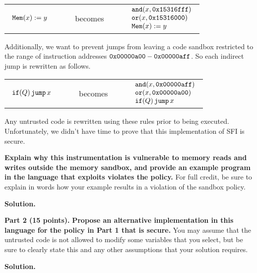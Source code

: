 \documentclass[10pt]{article}
\newcommand{\pand}[2]{\keywordfont{and}(#1, #2)}
\newcommand{\por}[2]{\keywordfont{or}(#1, #2)}
\begin{document}
\begin{enumerate}
\begin{center}
\begin{tabular}{lcl}
$
\begin{array}{l}
\texttt{\upshape Mem}(x) := y
\end{array}
$
&
\ \ \ \ becomes\ \ \ \ 
&
$
\begin{array}{l}
\pand{x}{\keywordfont{0x15316fff}} \\
\por{x}{\keywordfont{0x15316000}} \\
\pderef{x} := y
\end{array}
$
\end{tabular}
\end{center}
Additionally, we want to prevent jumps from leaving a code sandbox restricted to the range of instruction addresses $\texttt{\upshape 0x00000a00} - \texttt{\upshape 0x00000aff}$. So each indirect jump is rewritten as follows.
\begin{center}
\begin{tabular}{lcl}
$
\begin{array}{l}
\texttt{\upshape if}(Q)\,\texttt{\upshape jump}\,x
\end{array}
$
&
\ \ \ \ becomes\ \ \ \ 
&
$
\begin{array}{l}
\pand{x}{\keywordfont{0x00000aff}} \\
\por{x}{\keywordfont{0x00000a00}} \\
\pifjump{\ivr}{x}
\end{array}
$
\end{tabular}
\end{center}
Any untrusted code is rewritten using these rules prior to being executed.
Unfortunately, we didn't have time to prove that this implementation of SFI is secure. 

\newpage

\textbf{Explain why this instrumentation is vulnerable to memory reads and writes outside the memory sandbox, and provide an example program in the language that exploits  violates the policy.}
For full credit, be sure to explain in words how your example results in a violation of the sandbox policy.

\textbf{Solution.}



\newpage

\textbf{Part 2 (15 points).} \textbf{Propose an alternative implementation in this language for the policy in Part 1 that is secure.} You may assume that the untrusted code is not allowed to modify some variables that you select, but be sure to clearly state this and any other assumptions that your solution requires.

\textbf{Solution.}




\end{enumerate}
\end{document}
